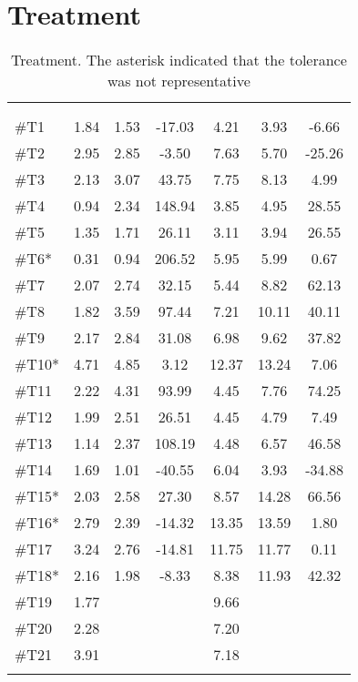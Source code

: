 \section{Treatment}
\begin{longtable} {l|c|c|c|c|c|c}
 \rowcolor[HTML]{C0C0C0} 
  \color[HTML]{000000}{} & 
 \multicolumn{3}{c|}{ \color[HTML]{000000}{\textbf{Threshold}}} & \multicolumn{3}{c}{ \color[HTML]{000000}{\textbf{Tolerance}}}  	\\  \rule{0pt}{3ex} 
  \cellcolor[HTML]{C0C0C0}{} &
 \multicolumn{1}{c|}{ \cellcolor[HTML]{C0C0C0}{Pre [KgF]}} & \multicolumn{1}{c|}{ \cellcolor[HTML]{C0C0C0}{Post [KgF]}} 
 & \multicolumn{1}{c}{ \cellcolor[HTML]{C0C0C0}{\textcolor[HTML]{C0C0C0}{0}Diff [\%]\textcolor[HTML]{C0C0C0}{0}}}
 & \multicolumn{1}{|c|}{ \cellcolor[HTML]{C0C0C0}{Pre [KgF]}} 
 & \multicolumn{1}{c|}{ \cellcolor[HTML]{C0C0C0}{Post [KgF]}} 
 & \multicolumn{1}{c}{ \cellcolor[HTML]{C0C0C0}{\textcolor[HTML]{C0C0C0}{0}Diff [\%]\textcolor[HTML]{C0C0C0}{0}}}  	\\ \hline 
\#T1 & 1.84 & 1.53 & -17.03 & 4.21 & 3.93 & -6.66 \\ \hline
\#T2 & 2.95 & 2.85  & -3.50 & 7.63  & 5.70 & -25.26 \\ \hline
\#T3 & 2.13 & 3.07 & 43.75 & 7.75 & 8.13 & 4.99 \\ \hline
\#T4 & 0.94 & 2.34  & 148.94  & 3.85 & 4.95 & 28.55 \\ \hline
\#T5 & 1.35 & 1.71  & 26.11 & 3.11 & 3.94 & 26.55 \\ \hline	
\#T6* & 0.31 & 0.94   & 206.52 & 5.95 & 5.99 & 0.67 \\ \hline
\#T7 & 2.07 & 2.74  & 32.15 & 5.44 & 8.82 & 62.13 \\ \hline
\#T8 & 1.82 & 3.59 & 97.44 & 7.21 & 10.11 & 40.11 \\ \hline
\#T9 & 2.17 & 2.84  & 31.08 & 6.98 & 9.62 & 37.82 \\ \hline
\#T10* & 4.71 & 4.85  & 3.12 & 12.37  & 13.24 & 7.06 \\ \hline
\#T11 & 2.22 & 4.31 & 93.99 & 4.45 & 7.76 & 74.25 \\ \hline
\#T12 & 1.99 & 2.51 & 26.51 & 4.45 & 4.79 & 7.49 \\ \hline
\#T13 & 1.14 & 2.37 & 108.19 & 4.48 & 6.57 & 46.58 \\ \hline
\#T14 & 1.69 & 1.01 & -40.55 & 6.04 & 3.93 & -34.88 \\ \hline
\#T15* & 2.03 & 2.58 & 27.30 & 8.57 & 14.28 & 66.56 \\ \hline
\#T16* & 2.79 & 2.39 & -14.32 & 13.35 & 13.59 & 1.80 \\ \hline
\#T17 & 3.24 & 2.76 & -14.81 & 11.75 & 11.77 & 0.11 \\ \hline
\#T18* & 2.16 & 1.98 & -8.33 & 8.38 & 11.93 & 42.32 \\ \hline
\#T19 & 1.77 &  & &9.66 & &  \\ \hline
\#T20 & 2.28 &  & & 7.20     & & \\ \hline
\#T21 & 3.91 &  & & 7.18 & & \\ \hline
	\caption{Treatment. The asterisk indicated that the tolerance was not representative}
	\label{tab:Treatment}
\end{longtable}
